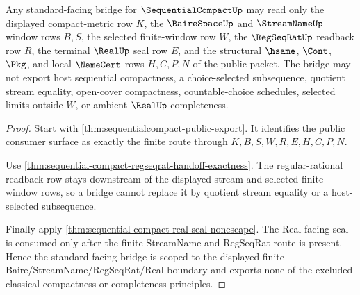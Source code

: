 \begin{theorem}
\label{thm:sequential-compact-standard-bridge-scope}
Any standard-facing bridge for $\SequentialCompactUp$ may read only the displayed compact-metric row $K$, the $\BaireSpaceUp$ and $\StreamNameUp$ window rows $B,S$, the selected finite-window row $W$, the $\RegSeqRatUp$ readback row $R$, the terminal $\RealUp$ seal row $E$, and the structural $\hsame$, $\Cont$, $\Pkg$, and local $\NameCert$ rows $H,C,P,N$ of the public packet. The bridge may not export host sequential compactness, a choice-selected subsequence, quotient stream equality, open-cover compactness, countable-choice schedules, selected limits outside $W$, or ambient $\RealUp$ completeness.
\end{theorem}
\begin{proof}
Start with \autoref{thm:sequentialcompact-public-export}. It identifies the public consumer surface as exactly the finite route through $K,B,S,W,R,E,H,C,P,N$.

Use \autoref{thm:sequential-compact-regseqrat-handoff-exactness}. The regular-rational readback row stays downstream of the displayed stream and selected finite-window rows, so a bridge cannot replace it by quotient stream equality or a host-selected subsequence.

Finally apply \autoref{thm:sequential-compact-real-seal-nonescape}. The Real-facing seal is consumed only after the finite StreamName and RegSeqRat route is present. Hence the standard-facing bridge is scoped to the displayed finite Baire/StreamName/RegSeqRat/Real boundary and exports none of the excluded classical compactness or completeness principles.
\end{proof}

